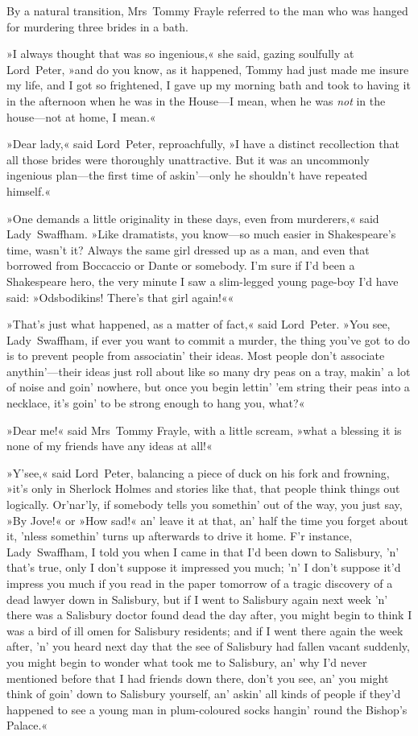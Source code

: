 By a natural transition, Mrs~Tommy Frayle referred to the man who was hanged for murdering three brides in a bath.

»I always thought that was so ingenious,« she said, gazing soulfully at Lord~Peter, »and do you know, as it happened, Tommy had just made me insure my life, and I got so frightened, I gave up my morning bath and took to having it in the afternoon when he was in the House—I mean, when he was \textit{not} in the house—not at home, I mean.«

»Dear lady,« said Lord~Peter, reproachfully, »I have a distinct recollection that all those brides were thoroughly unattractive. But it was an uncommonly ingenious plan—the first time of askin'---only he shouldn't have repeated himself.«

»One demands a little originality in these days, even from murderers,« said Lady~Swaffham. »Like dramatists, you know—so much easier in Shakespeare's time, wasn't it? Always the same girl dressed up as a man, and even that borrowed from Boccaccio or Dante or somebody. I'm sure if I'd been a Shakespeare hero, the very minute I saw a slim-legged young page-boy I'd have said: »Odsbodikins! There's that girl again!««

»That's just what happened, as a matter of fact,« said Lord~Peter. »You see, Lady~Swaffham, if ever you want to commit a murder, the thing you've got to do is to prevent people from associatin' their ideas. Most people don't associate anythin'---their ideas just roll about like so many dry peas on a tray, makin' a lot of noise and goin' nowhere, but once you begin lettin' 'em string their peas into a necklace, it's goin' to be strong enough to hang you, what?«

»Dear me!« said Mrs~Tommy Frayle, with a little scream, »what a blessing it is none of my friends have any ideas at all!«

»Y'see,« said Lord~Peter, balancing a piece of duck on his fork and frowning, »it's only in Sherlock Holmes and stories like that, that people think things out logically. Or'nar'ly, if somebody tells you somethin' out of the way, you just say, »By Jove!« or »How sad!« an' leave it at that, an' half the time you forget about it, 'nless somethin' turns up afterwards to drive it home. F'r instance, Lady~Swaffham, I told you when I came in that I'd been down to Salisbury, 'n' that's true, only I don't suppose it impressed you much; 'n' I don't suppose it'd impress you much if you read in the paper tomorrow of a tragic discovery of a dead lawyer down in Salisbury, but if I went to Salisbury again next week 'n' there was a Salisbury doctor found dead the day after, you might begin to think I was a bird of ill omen for Salisbury residents; and if I went there again the week after, 'n' you heard next day that the see of Salisbury had fallen vacant suddenly, you might begin to wonder what took me to Salisbury, an' why I'd never mentioned before that I had friends down there, don't you see, an' you might think of goin' down to Salisbury yourself, an' askin' all kinds of people if they'd happened to see a young man in plum-coloured socks hangin' round the Bishop's Palace.«

